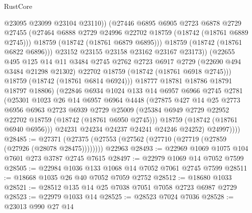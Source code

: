 \begin{lexlean}{RustCore}
\begin{coremodule}
                        @23095
                        @23099
                        @23104
                        @23110))
                    (@27446
                      @6895
                      @6905
                      @2723
                      @6878
                      @2729
                      @27455
                      (@27464 @6888 @2729 @24996 @22702 @18759 (@18742 (@18761 @6889 @2745)))
                      @18759
                      (@18742 (@18761 @6879 @6895)))
                    @18759
                    (@18742 (@18761 @6822 @6896)))
                  @23152
                  @23155
                  @23158
                  @23162
                  @23167
                  @23173))
              (@22655
                @495
                @125
                @14
                @11
                @3484
                @2745
                @2762
                @2723
                @6917
                @2729
                (@22690 @494 @3484 @21298 @21302)
                @22702
                @18759
                (@18742 (@18761 @6918 @2745)))
              @18759
              (@18742 (@18761 @6814 @6924)))
            @18777
            @18781
            @18786
            @18791
            @18797
            @18806)
          (@22846
            @6934
            @1024
            @133
            @14
            @6957
            @6966
            @2745
            @2781
            (@25301
              @1023
              @26
              @14
              @6957
              @6964
              @4448
              (@27875
                @427
                @14
                @25
                @2773
                @6956
                @6963
                @2723
                @6939
                @2729
                @25009
                (@25384 @6949 @2729 @22952 @22702 @18759 (@18742 (@18761 @6950 @2745)))
                @18759
                (@18742 (@18761 @6940 @6956)))
              @24231
              @24234
              @24237
              @24241
              @24246
              @24252)
            @24997))))
@28485 := @27371
    (@27375 (@27553 (@27562 (@27710 (@27719 (@27859 (@27926 (@28078 @28475))))))))
    @22963
@28493 := @22969 @1069 @1075 @104 @7601 @273 @3787 @2745 @7615
@28497 := @22979 @1069 @14 @7052 @7599
@28505 := @22984 @1036 @133 @1068 @14 @7052 @7061 @2745 @7599
@28511 := @18668 @1035 @26 @40 @7052 @7059 @2752
@28512 := @18680 @1033
@28521 := @28512 @135 @14 @25 @7038 @7051 @7058 @2723 @6987 @2729
@28523 := @22979 @1033 @14
@28525 := @28523 @7024 @7036
@28528 := @23013 @990 @27 @14

\end{coremodule}
\end{lexlean}
